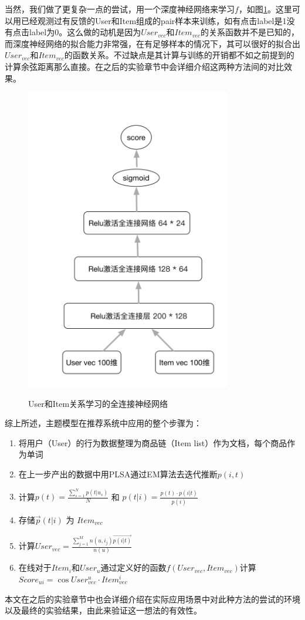 当然，我们做了更复杂一点的尝试，用一个深度神经网络来学习$f$，如图\ref{fig:Dnn}。这里可以用已经观测过有反馈的User和Item组成的pair样本来训练，如有点击label是1没有点击label为0。这么做的动机是因为$User_{vec}$和$Item_{vec}$的关系函数并不是已知的，而深度神经网络的拟合能力非常强，在有足够样本的情况下，其可以很好的拟合出$User_{vec}$和$Item_{vec}$的函数关系。不过缺点是其计算与训练的开销都不如之前提到的计算余弦距离那么直接。在之后的实验章节中会详细介绍这两种方法间的对比效果。
\begin{figure}[!h]
\centering
  \includegraphics[width=0.8\textwidth]{./graph/Dnn.png}\\
  \caption{User和Item关系学习的全连接神经网络}
\label{fig:Dnn}
\end{figure}

综上所述，主题模型在推荐系统中应用的整个步骤为：
\begin{enumerate}[步骤 1.]
\item 将用户（User）的行为数据整理为商品链（Item list）作为文档，每个商品作为单词
\item 在上一步产出的数据中用PLSA通过EM算法去迭代推断$p(i,t)$
\item 计算$p(t) = \frac{\sum_{s=1}^N p(t|u_s)}{N}$ 和 $p(t|i) = \frac{p(t) \cdot p(i|t)}{p(i)}$
\item 存储$\overrightarrow p(t|i)$ 为 $Item_{vec}$
\item 计算$User_{vec} = \frac{\sum_{j=1}^M n(u,i_j)\overrightarrow {p(i|t)}}{n(u)}$
\item 在线对于$Item_i$和$User_u$通过定义好的函数$f(User_{vec}, Item_{vec})$计算$Score_{ui} = \cos User_{vec}^u \cdot Item_{vec}^i$
	
\end{enumerate}
本文在之后的实验章节中也会详细介绍在实际应用场景中对此种方法的尝试的环境以及最终的实验结果，由此来验证这一想法的有效性。
